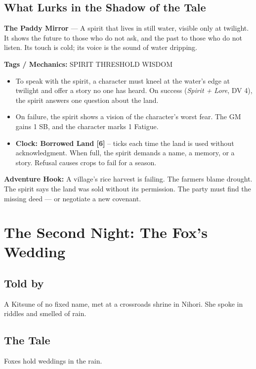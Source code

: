\documentclass[10pt,twoside]{book}
\newcommand{\tag}[1]{\textsc{#1}}
\begin{document}
\section*{What Lurks in the Shadow of the Tale}
\begin{infobox}
\textbf{The Paddy Mirror} --- A spirit that lives in still water, visible only at twilight. It shows the future to those who do not ask, and the past to those who do not listen. Its touch is cold; its voice is the sound of water dripping.

\textbf{Tags / Mechanics:} \tag{SPIRIT} \tag{THRESHOLD} \tag{WISDOM}

\begin{itemize}
\item To speak with the spirit, a character must kneel at the water's edge at twilight and offer a story no one has heard. On success (\textit{Spirit + Lore}, DV 4), the spirit answers one question about the land.
\item On failure, the spirit shows a vision of the character's worst fear. The GM gains 1 SB, and the character marks 1 Fatigue.
\item \textbf{Clock: Borrowed Land [6]} -- ticks each time the land is used without acknowledgment. When full, the spirit demands a name, a memory, or a story. Refusal causes crops to fail for a season.
\end{itemize}

\textbf{Adventure Hook:} A village's rice harvest is failing. The farmers blame drought. The spirit says the land was sold without its permission. The party must find the missing deed --- or negotiate a new covenant.
\end{infobox}

\chapter{The Second Night: The Fox's Wedding}

\section*{Told by}
A Kitsune of no fixed name, met at a crossroads shrine in Nihori. She spoke in riddles and smelled of rain.

\section*{The Tale}
Foxes hold weddings in the rain.
\end{document}
